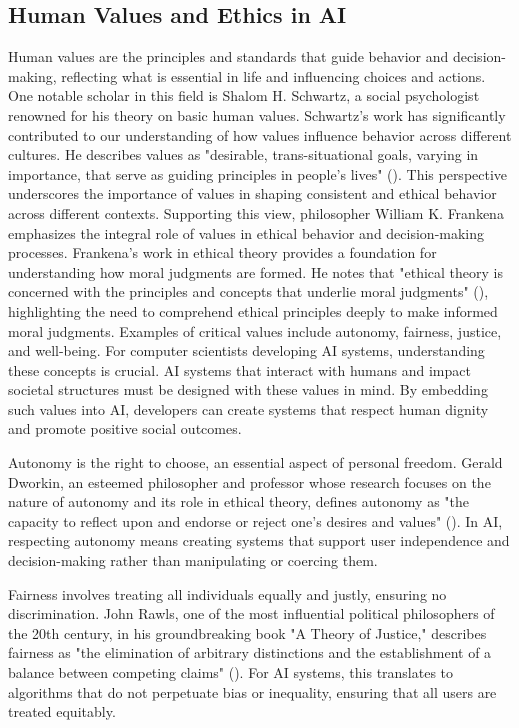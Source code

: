 \documentclass[
  letterpaper,
  DIV=11,
  numbers=noendperiod,
  oneside]{scrreprt}
\theoremstyle{remark}
\begin{document}
\subsection{Human Values and Ethics in
AI}\label{human-values-and-ethics-in-ai}

Human values are the principles and standards that guide behavior and
decision-making, reflecting what is essential in life and influencing
choices and actions. One notable scholar in this field is Shalom H.
Schwartz, a social psychologist renowned for his theory on basic human
values. Schwartz's work has significantly contributed to our
understanding of how values influence behavior across different
cultures. He describes values as "desirable, trans-situational goals,
varying in importance, that serve as guiding principles in people's
lives" (). This
perspective underscores the importance of values in shaping consistent
and ethical behavior across different contexts. Supporting this view,
philosopher William K. Frankena emphasizes the integral role of values
in ethical behavior and decision-making processes. Frankena's work in
ethical theory provides a foundation for understanding how moral
judgments are formed. He notes that "ethical theory is concerned with
the principles and concepts that underlie moral judgments"
(), highlighting the
need to comprehend ethical principles deeply to make informed moral
judgments. Examples of critical values include autonomy, fairness,
justice, and well-being. For computer scientists developing AI systems,
understanding these concepts is crucial. AI systems that interact with
humans and impact societal structures must be designed with these values
in mind. By embedding such values into AI, developers can create systems
that respect human dignity and promote positive social outcomes.

Autonomy is the right to choose, an essential aspect of personal
freedom. Gerald Dworkin, an esteemed philosopher and professor whose
research focuses on the nature of autonomy and its role in ethical
theory, defines autonomy as "the capacity to reflect upon and endorse or
reject one's desires and values"
(). In AI, respecting
autonomy means creating systems that support user independence and
decision-making rather than manipulating or coercing them.

Fairness involves treating all individuals equally and justly, ensuring
no discrimination. John Rawls, one of the most influential political
philosophers of the 20th century, in his groundbreaking book "A Theory
of Justice," describes fairness as "the elimination of arbitrary
distinctions and the establishment of a balance between competing
claims" (). For AI systems,
this translates to algorithms that do not perpetuate bias or inequality,
ensuring that all users are treated equitably.
\end{document}
